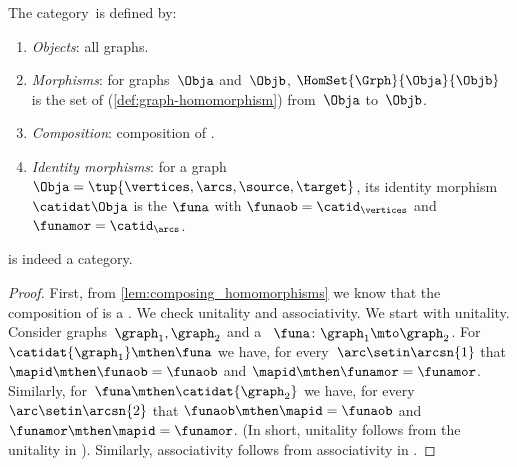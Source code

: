 \begin{ctdefinition}
    \label{def:Grph}
    The category~\Grph is defined by:
    \begin{enumerate}
        \item \emph{Objects}: all graphs.
        \item \emph{Morphisms}: for graphs~$\Obja$ and~$\Objb$, $\HomSet{\Grph}{\Obja}{\Objb}$ is the set of  (\cref{def:graph-homomorphism}) from~$\Obja$ to~$\Objb$.
        \item \emph{Composition}: composition of .
        \item \emph{Identity morphisms}: for a graph~$\Obja =\tup{\vertices,\arcs,\source,\target}$,
              its identity morphism $\catidat\Obja$ is the  $\funa$ with $\funaob = \catid_{\vertices}$ and $\funamor= \catid_{\arcs}$.
    \end{enumerate}
\end{ctdefinition}

\begin{lemma}\label{lem:Grph-is-cat}
    \Grph is indeed a category.
\end{lemma}

\begin{proof}
    First, from \cref{lem:composing_homomorphisms} we know that the composition of  is a .
    We check unitality and associativity.
    We start with unitality.
    Consider graphs~$\graph_1,\graph_2$ and a ~$\funa\colon \graph_1\mto \graph_2$.
    For~$\catidat{\graph_1}\mthen \funa$ we have, for every~$\arc \setin \arcsn{1}$ that $\mapid\mthen \funaob=\funaob$ and $\mapid\mthen \funamor=\funamor$.
    Similarly, for~$\funa \mthen \catidat{\graph_2}$ we have, for every $\arc \setin \arcsn{2}$ that $\funaob\mthen \mapid=\funaob$ and $\funamor \mthen \mapid=\funamor$.
    (In short, unitality follows from the unitality in \Set).
    Similarly, associativity follows from associativity in \Set.
\end{proof}
